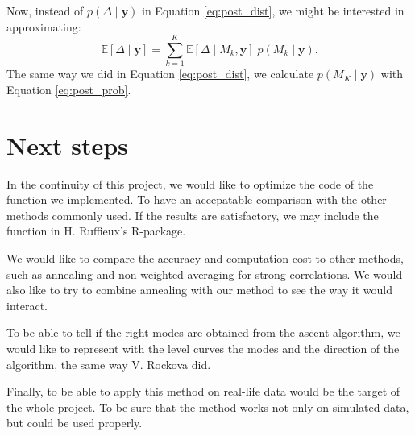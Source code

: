 \documentclass{article}
\numberwithin{equation}{section}
\begin{document}
Now, instead of $p(\Delta \mid \boldsymbol{y})$ in Equation \ref{eq:post_dist}, we might be interested in approximating:
\begin{equation*}
\mathbb{E}\left[\Delta \mid \boldsymbol{y}\right] = \sum_{k=1}^K\mathbb{E}\left[\Delta \mid M_k, \boldsymbol{y}\right]\;p(M_k \mid \boldsymbol{y}).
\end{equation*}
The same way we did in Equation \ref{eq:post_dist}, we calculate $p(M_K \mid \boldsymbol{y})$ with Equation \ref{eq:post_prob}.


%
%
\newpage
\section{Next steps}
In the continuity of this project, we would like to optimize the code of the function we implemented. To have an accepatable comparison with the other methods commonly used. If the results are satisfactory, we may include the function in H. Ruffieux's R-package.

We would like to compare the accuracy and computation cost to other methods, such as annealing and non-weighted averaging for strong correlations. We would also like to try to combine annealing with our method to see the way it would interact.

To be able to tell if the right modes are obtained from the ascent algorithm, we would like to represent with the level curves the modes and the direction of the algorithm, the same way V. Rockova did.

Finally, to be able to apply this method on real-life data would be the target of the whole project. To be sure that the method works not only on simulated data, but could be used properly.
\newpage


\end{document}
